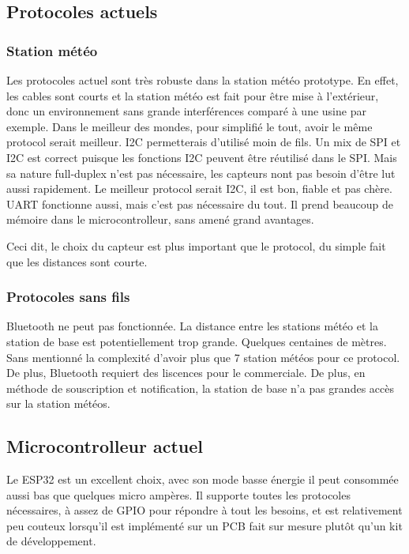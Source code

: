 \subsection{Protocoles actuels}
\subsubsection{Station météo}
Les protocoles actuel sont très robuste dans la station météo prototype.
En effet, les cables sont courts et la station météo est fait pour être mise à l'extérieur, donc un environnement sans grande interférences
comparé à une usine par exemple. Dans le meilleur des mondes, pour simplifié le tout, avoir le même protocol serait meilleur.
I2C permetterais d'utilisé moin de fils. Un mix de SPI et I2C est correct puisque les fonctions I2C peuvent être réutilisé dans le SPI.
Mais sa nature full-duplex n'est pas nécessaire, les capteurs nont pas besoin d'être lut aussi rapidement.
Le meilleur protocol serait I2C, il est bon, fiable et pas chère. UART fonctionne aussi, mais c'est pas nécessaire du tout. Il prend beaucoup
de mémoire dans le microcontrolleur, sans amené grand avantages.

Ceci dit, le choix du capteur est plus important que le protocol, du simple fait que les distances sont courte.

\subsubsection{Protocoles sans fils}
Bluetooth ne peut pas fonctionnée. La distance entre les stations météo et la station de base est potentiellement trop grande. Quelques
centaines de mètres. Sans mentionné la complexité d'avoir plus que 7 station météos pour ce protocol. De plus, Bluetooth requiert des
liscences pour le commerciale.
De plus, en méthode de souscription et notification, la station de base n'a pas grandes accès sur la station météos.

\subsection{Microcontrolleur actuel}
Le ESP32 est un excellent choix, avec son mode basse énergie il peut consommée aussi bas que quelques micro ampères.
Il supporte toutes les protocoles nécessaires, à assez de GPIO pour répondre à tout les besoins, et est relativement peu couteux
lorsqu'il est implémenté sur un PCB fait sur mesure plutôt qu'un kit de développement.